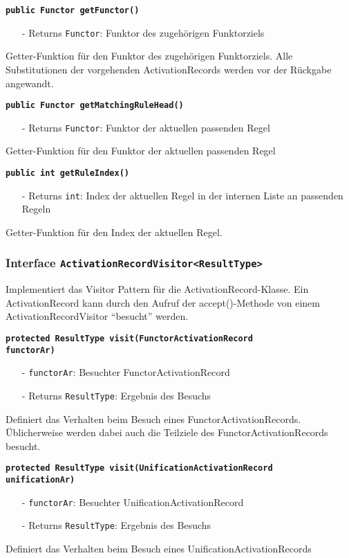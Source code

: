 \documentclass[parskip=full,11pt,twoside]{scrartcl}
\begin{document}
\textbf{\texttt{public Functor getFunctor()}}
\begin{itemize}[noitemsep]
	\item[-] Returns \texttt{Functor}: Funktor des zugehörigen Funktorziels
\end{itemize}
Getter-Funktion für den Funktor des zugehörigen Funktorziels. Alle Substitutionen der vorgehenden ActivationRecords werden vor der Rückgabe angewandt. 

\textbf{\texttt{public Functor getMatchingRuleHead()}}
\begin{itemize}[noitemsep]
	\item[-] Returns \texttt{Functor}: Funktor der aktuellen passenden Regel
\end{itemize}
Getter-Funktion für den Funktor der aktuellen passenden Regel

\textbf{\texttt{public int getRuleIndex()}}
\begin{itemize}[noitemsep]
	\item[-] Returns \texttt{int}: Index der aktuellen Regel in der internen Liste an passenden Regeln 
\end{itemize}
Getter-Funktion für den Index der aktuellen Regel.

\subsubsection{Interface \texttt{ActivationRecordVisitor<ResultType>}}

Implementiert das Visitor Pattern für die ActivationRecord-Klasse. Ein ActivationRecord kann durch den Aufruf der accept()-Methode von einem ActivationRecordVisitor \enquote{besucht} werden.

\textbf{\texttt{protected ResultType visit(FunctorActivationRecord\\functorAr)}}
\begin{itemize}[noitemsep]
	\item[-] \texttt{functorAr}: Besuchter FunctorActivationRecord
	\item[-] Returns \texttt{ResultType}: Ergebnis des Besuchs
\end{itemize}
Definiert das Verhalten beim Besuch eines FunctorActivationRecords. Üblicherweise werden dabei auch die Teilziele des FunctorActivationRecords besucht.

\textbf{\texttt{protected ResultType visit(UnificationActivationRecord\\unificationAr)}}
\begin{itemize}[noitemsep]
	\item[-] \texttt{functorAr}: Besuchter UnificationActivationRecord
	\item[-] Returns \texttt{ResultType}: Ergebnis des Besuchs
\end{itemize}
Definiert das Verhalten beim Besuch eines UnificationActivationRecords
\end{document}
